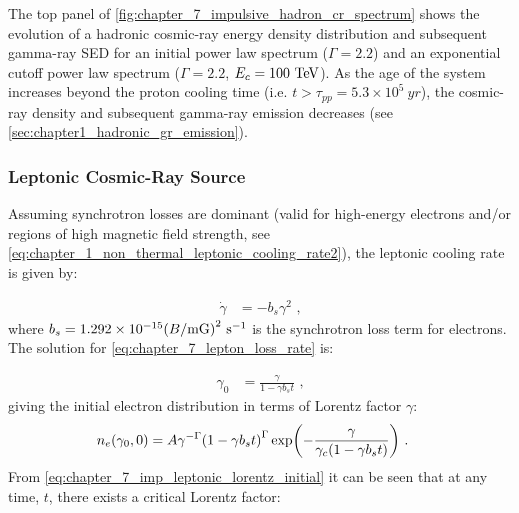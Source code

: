 The top panel of \autoref{fig:chapter_7_impulsive_hadron_cr_spectrum} shows the evolution of a hadronic cosmic-ray energy density distribution and subsequent gamma-ray SED for an initial power law spectrum ($\Gamma=2.2$) and an exponential cutoff power law spectrum ($\Gamma=2.2$, $E_c=100~\TeV$). As the age of the system increases beyond the proton cooling time (i.e. $t>\tau_{pp}=5.3\times 10^5~\si{yr}$), the cosmic-ray density and subsequent gamma-ray emission decreases (see \autoref{sec:chapter1_hadronic_gr_emission}).

\subsubsection{Leptonic Cosmic-Ray Source}

Assuming synchrotron losses are dominant (valid for high-energy electrons and/or regions of high magnetic field strength, see \autoref{eq:chapter_1_non_thermal_leptonic_cooling_rate2}), the leptonic cooling rate is given by:

\begin{equation}
    \begin{aligned}
        \dot{\gamma}&=-b_s\gamma^2 \text{ ,}
    \end{aligned}\label{eq:chapter_7_lepton_loss_rate}
\end{equation}
\noindent where $b_s = 1.292 \times 10^{-15} \qty(B/\si{\milli G})^2~\si{\per\second}$ is the synchrotron loss term for electrons. The solution for \autoref{eq:chapter_7_lepton_loss_rate} is:

\begin{equation}
	\begin{aligned}
		\gamma_0&=\frac{\gamma}{1-\gamma b_s t} \text{ ,}
	\end{aligned} \label{eq:chapter_7_imp_leptonic_lorentz_initial}
\end{equation}
\noindent giving the initial electron distribution in terms of Lorentz factor $\gamma$:
\begin{equation}
    \begin{aligned}
        n_e\qty(\gamma_0,0)&=A\gamma^{-\Gamma}\qty(1-\gamma b_s t)^{\Gamma}\exp(-\frac{\gamma}{\gamma_c\qty(1-\gamma b_st)})\text{ .} 
    \end{aligned} \label{eq:chapter_7_imp_leptonic_cr_initial_distrib}
\end{equation}
\noindent From \autoref{eq:chapter_7_imp_leptonic_lorentz_initial} it can be seen that at any time, $t$, there exists a critical Lorentz factor:

